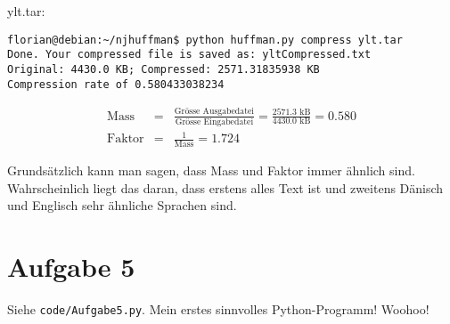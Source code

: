 \documentclass[11pt]{article} %
\theoremstyle{definition}
\begin{document}
\begin{enumerate}[(1)]
ylt.tar:

\begin{verbatim}
florian@debian:~/njhuffman$ python huffman.py compress ylt.tar
Done. Your compressed file is saved as: yltCompressed.txt
Original: 4430.0 KB; Compressed: 2571.31835938 KB
Compression rate of 0.580433038234
\end{verbatim}

\begin{eqnarray*}
\textrm{Mass} &=& \frac{\textrm{Grösse Ausgabedatei}}{\textrm{Grösse Eingabedatei}} = \frac{2571.3 \textrm{ kB}}{4430.0 \textrm{ kB}} = 0.580 \\
\textrm{Faktor} &=& \frac{1}{\textrm{Mass}} = 1.724
\end{eqnarray*}

Grundsätzlich kann man sagen, dass Mass und Faktor immer ähnlich sind. Wahrscheinlich liegt das daran, dass erstens alles Text ist und zweitens Dänisch und Englisch sehr ähnliche Sprachen sind.

\end{enumerate}

\section*{Aufgabe 5}

Siehe {\tt code/Aufgabe5.py}. Mein erstes sinnvolles Python-Programm! Woohoo!
\end{document}
